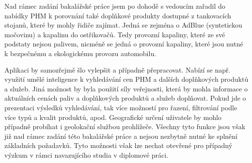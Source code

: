 Nad rámec zadání bakalářské práce jsem po dohodě s vedoucím zařadil
do nabídky PHM k porovnání také doplňkové produkty dostupné z tankovacích
stojanů, které by mohly řidiče zajímat. Jedná se zejména o AdBlue
(syntetickou močovinu) a kapalinu do ostřikovačů. Tedy provozní kapaliny,
které ze své podstaty nejsou palivem, nicméně se jedná o provozní kapaliny,
které jsou nutné k bezpečnému a ekologickému provozu automobilu.

Aplikaci by samozřejmě šlo vylepšit a případně přepracovat. Nabízí se např.
využití umělé inteligence k vyhledávání cen PHM a dalších doplňkových
produktů a služeb. Jiná možnost by byla použití síly veřejnosti, která
by mohla informace o aktuálních cenách paliv a doplňkových produktů a služeb
doplňovat. Pokud jde o prezentaci výsledků vyhledávání, tak více možností
pro řazení, filtrování podle více typů a kvalit produktů, apod. Geografické
určení uživatele by mohlo případně probíhat i geolokační službou prohlížeče.
Všechny tyto funkce jsou však již nad rámec zadání této bakalářské práce
a nejsou nezbytně nutné ke splnění základních požadavků. Tyto možnosti však
lze nechat otevřené pro případný výzkum v rámci navazujícího studia
v diplomové práci.

\endinput
